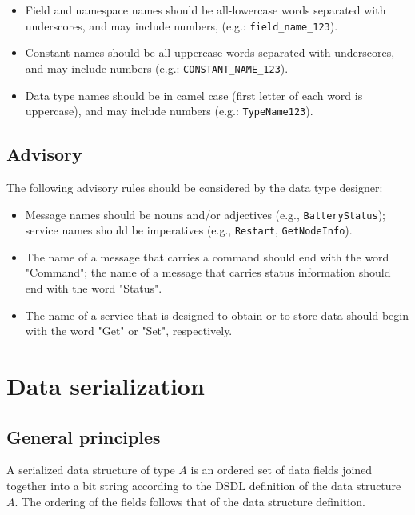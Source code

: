\begin{itemize}
    \item Field and namespace names should be all-lowercase words separated with underscores,
          and may include numbers, (e.g.: \verb|field_name_123|).

    \item Constant names should be all-uppercase words separated with underscores,
          and may include numbers (e.g.: \verb|CONSTANT_NAME_123|).

    \item Data type names should be in camel case (first letter of each word is uppercase),
          and may include numbers (e.g.: \verb|TypeName123|).
\end{itemize}

\subsection{Advisory}

The following advisory rules should be considered by the data type designer:

\begin{itemize}
    \item Message names should be nouns and/or adjectives (e.g., \verb|BatteryStatus|);
    service names should be imperatives (e.g., \verb|Restart|, \verb|GetNodeInfo|).

    \item The name of a message that carries a command should end with the word "Command";
          the name of a message that carries status information should end with the word "Status".

    \item The name of a service that is designed to obtain or to store data should begin with the word
          "Get" or "Set", respectively.
\end{itemize}

\section{Data serialization}\label{sec:dsdl_data_serialization}

\subsection{General principles}

A serialized data structure of type $A$ is an ordered set of data fields joined together into a bit string
according to the DSDL definition of the data structure $A$.
The ordering of the fields follows that of the data structure definition.

